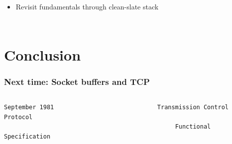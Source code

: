 \begin{frame}
\begin{columns}[T]
\begin{itemize}
      \medskip
      \pause

      \item Revisit fundamentals through clean-slate stack
    \end{itemize}
  \end{columns}
\end{frame}

\section{Conclusion}

\begin{frame}[fragile]
  \frametitle{Next time: Socket buffers and TCP}

  \begin{columns}[T]

  \begin{Tiny}
    \begin{verbatim}
September 1981                             Transmission Control Protocol
                                                Functional Specification


\end{verbatim}
\end{Tiny}
\end{columns}
\end{frame}
